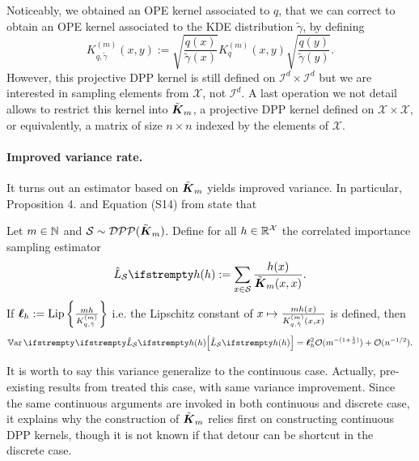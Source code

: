 Noticeably, we obtained an OPE kernel associated to $q$, that we can correct to obtain an OPE kernel associated to the KDE distribution $\tilde \gamma$, by defining 
\begin{equation}
	K_{q, \tilde{\gamma}}^{(m)}(x, y):=\sqrt{\frac{q(x)}{\tilde{\gamma}(x)}} K_q^{(m)}(x, y) \sqrt{\frac{q(y)}{\tilde{\gamma}(y)}}.
\end{equation}
However, this projective DPP kernel is still defined on $\mathcal{I}^d \times \mathcal{I}^d$ but we are interested in sampling elements from $\mathcal{X}$, not $\mathcal{I}^d$. A last operation we not detail allows to restrict this kernel into $\tilde{\boldsymbol K}_{m}$, a projective DPP kernel defined on $\mathcal{X} \times \mathcal{X}$, or equivalently, a matrix of size $n \times n$ indexed by the elements of $\mathcal{X}$.

\paragraph{Improved variance rate.}
It turns out an estimator based on $\tilde{\boldsymbol K}_{m}$ yields improved variance. In particular, Proposition 4. and Equation (S14) from \cite{bardenet2021sgddpp} state that

\newpage

\begin{tcolorbox}
	\begin{theorem}
		\label{thm_sgdpaper}
		Let $m\in \mathbb{N}$ and $\mathcal{S} \sim  \mathcal{DPP}(\tilde{\boldsymbol K}_{m})$. Define for all $h \in \mathbb{R}^{\mathcal{X}}$ the correlated importance sampling estimator
		\begin{equation}
			\estloss{\mathcal{S}}{\threequery} := \sum_{x \in \mathcal{S}} \frac{\threequery(x)}{\opekernel{m}(x,x)}.
		\end{equation}
		If  $\boldsymbol\ell_h := \operatorname{Lip}\left\{\frac{mh}{K^{(m)}_{q, \tilde \gamma}} \right\}$ i.e. the Lipschitz constant of $x \mapsto \frac{mh(x)}{K^{(m)}_{q, \tilde \gamma}(x,x)}$ is defined, then 
		\begin{equation}
			\label{eqn__improved_var}
			\Var{}{\estloss{\mathcal{S}}{\threequery}} = \lipschitz^2_\threequery \OO( m ^{-(1+\frac 1 d)}) +\OO( n^{-1/2}).
		\end{equation}
	\end{theorem}
\end{tcolorbox}

It is worth to say this variance generalize to the continuous case. Actually, pre-existing results from \cite{bardenet2020mcdpp} treated this case, with same variance improvement. Since the same continuous arguments are invoked in both continuous and discrete case, it explains why the construction of $\tilde{\boldsymbol K}_{m}$ relies first on constructing continuous DPP kernels, though it is not known if that detour can be shortcut in the discrete case.

